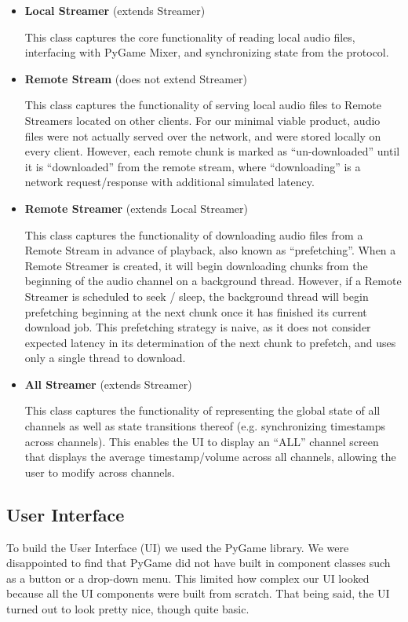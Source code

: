 \documentclass[%
               nonacm,sigconf,10pt]{acmart}
\begin{document}
\begin{itemize}
    \item \textbf{Local Streamer} (extends Streamer)
    
    This class captures the core functionality of reading local audio files, interfacing with PyGame Mixer, and synchronizing state from the protocol.
    \item \textbf{Remote Stream} (does not extend Streamer)
    
    This class captures the functionality of serving local audio files to Remote Streamers located on other clients. For our minimal viable product, audio files were not actually served over the network, and were stored locally on every client. However, each remote chunk is marked as ``un-downloaded'' until it is ``downloaded'' from the remote stream, where ``downloading'' is a network request/response with additional simulated latency.
    \item \textbf{Remote Streamer} (extends Local Streamer)
    
    This class captures the functionality of downloading audio files from a Remote Stream in advance of playback, also known as ``prefetching''. When a Remote Streamer is created, it will begin downloading chunks from the beginning of the audio channel on a background thread. However, if a Remote Streamer is scheduled to seek / sleep, the background thread will begin prefetching beginning at the next chunk once it has finished its current download job. This prefetching strategy is naive, as it does not consider expected latency in its determination of the next chunk to prefetch, and uses only a single thread to download.
    \item \textbf{All Streamer} (extends Streamer)
    
    This class captures the functionality of representing the global state of all channels as well as state transitions thereof (e.g. synchronizing timestamps across channels). This enables the UI to display an ``ALL'' channel screen that displays the average timestamp/volume across all channels, allowing the user to modify across channels.
\end{itemize}

\subsection{User Interface}\label{subsec:ui}

To build the User Interface (UI) we used the PyGame library. We were disappointed to find that PyGame did not have built in component classes such as a button or a drop-down menu. This limited how complex our UI looked because all the UI components were built from scratch. That being said, the UI turned out to look pretty nice, though quite basic.
\end{document}
